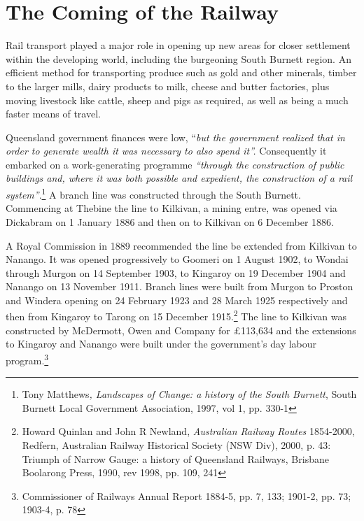\section{The Coming of the Railway}



\balance


Rail transport played a major role in opening up new areas for closer settlement within the developing world, including the burgeoning South Burnett region. An efficient method for transporting produce such as gold and other minerals, timber to the larger mills, dairy products to milk, cheese and butter factories, plus moving livestock like cattle, sheep and pigs as required, as well as being a much faster means of travel.



Queensland government finances were low, ``\emph{but the government realized that in order to generate wealth it was necessary to also spend it''.} Consequently it embarked on a work-generating programme \emph{``through the construction of public buildings and, where it was both possible and expedient, the construction of a rail system''}.\footnote{Tony Matthews\emph{, Landscapes of Change: a history of the South Burnett}, South Burnett Local Government Association, 1997, vol 1, pp. 330-1} A branch line was constructed through the South Burnett. Commencing at Thebine the line to Kilkivan, a mining entre, was opened via Dickabram on 1 January 1886 and then on to Kilkivan on 6 December 1886.


A Royal Commission in 1889 recommended the line be extended from Kilkivan to Nanango. It was opened progressively to Goomeri on 1 August 1902, to Wondai through Murgon on 14 September 1903, to Kingaroy on 19 December 1904 and Nanango on 13 November 1911. Branch lines were built from Murgon to Proston and Windera opening on 24 February 1923 and 28 March 1925 respectively and then from Kingaroy to Tarong on 15 December 1915.\footnote{Howard Quinlan and John R Newland, \emph{Australian Railway Routes} 1854-2000, Redfern, Australian Railway Historical Society (NSW Div), 2000, p. 43: Triumph of Narrow Gauge: a history of Queensland Railways, Brisbane Boolarong Press, 1990, rev 1998, pp. 109, 241} The line to Kilkivan was constructed by McDermott, Owen and Company for \pounds113,634 and the extensions to Kingaroy and Nanango were built under the government's day labour program.\footnote{Commissioner of Railways Annual Report 1884-5, pp. 7, 133; 1901-2, pp. 73; 1903-4, p. 78}



